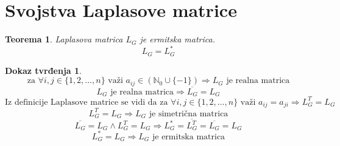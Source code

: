 \documentclass[11pt]{article}
\newtheorem{theorem}{Teorema}
\newtheorem*{custom_proof}{Dokaz tvrđenja}
\begin{document}
	\section{Svojstva Laplasove matrice}
	
	\begin{theorem} Laplasova matrica $L_G$ je ermitska matrica.
	\[
	L_G = L_G^*
	\] 
	\end{theorem}
	
	\begin{custom_proof}
	\[
	\text{za }\forall i,j \in \{1, 2, \dots, n\} \text{ važi } a_{ij} \in (\mathbb{N}_0 \cup \{-1\}) \Rightarrow L_G \text{ je realna matrica}
	\]
	\[
	 L_G \text{ je realna matrica} \Rightarrow \overline{L_G} = L_G 
	\]
	\[
	\text{Iz definicije Laplasove matrice se vidi da za } \forall i,j \in \{1, 2, \dots, n\} \text{ važi } a_{ij} = a_{ji} \Rightarrow L_G^T = L_G 
	\]
	\[
	  L_G^T = L_G \Rightarrow L_G \text{ je simetrična matrica}
	\]
	\[
	\overline{L_G} = L_G \land L_G^T = L_G \Rightarrow L_G^* = \overline{L_G^T} = \overline{L_G} = L_G 
	\]
	\[
	L_G^* = L_G \Rightarrow L_G\text{ je ermitska matrica}
	\]
	\end{custom_proof}
	
\end{document}
